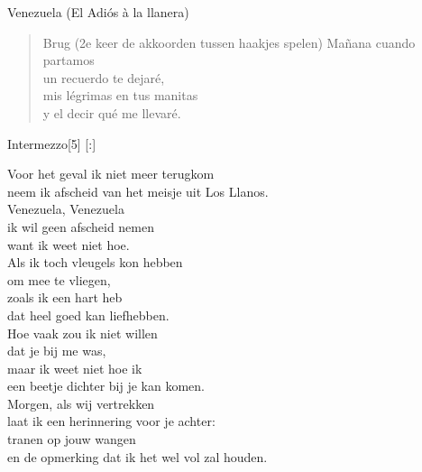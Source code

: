\begin{song}[joropo]{Venezuela (El Adiós à la llanera)}
\begin{verse}{Brug (2e keer de akkoorden tussen haakjes spelen)}
Ma\~{n}ana cuando partamos\\
un recuerdo te dejar\'{e},\hspace{2em}\hspace{5em}\\
mis l\'{e}grimas en tus manitas\\
y el decir qu\'{e} me llevar\'{e}.
\end{verse}
\begin{instrumental}{Intermezzo}[5]
  \measure{}  \measure{}    [:] 
\end{instrumental}

\end{song}

\clearpage
\begin{translation}
Voor het geval ik niet meer terugkom\\
neem ik afscheid van het meisje uit Los Llanos.\\
Venezuela, Venezuela\\
ik wil geen afscheid nemen\\
want ik weet niet hoe.\\\vspace{1em}
Als ik toch vleugels kon hebben\\
om mee te vliegen,\\
zoals ik een hart heb\\
dat heel goed kan liefhebben.\\\vspace{1em}
Hoe vaak zou ik niet willen\\
dat je bij me was,\\
maar ik weet niet hoe ik\\
een beetje dichter bij je kan komen.\\\vspace{1em}
Morgen, als wij vertrekken\\
laat ik een herinnering voor je achter:\\
tranen op jouw wangen\\
en de opmerking dat ik het wel vol zal houden. \\
\end{translation}
